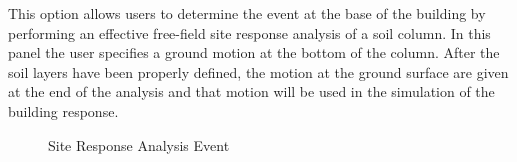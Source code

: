 This option allows users to determine the event at the base of the 
building by performing an effective free-field site response 
analysis of a soil column. In this panel the user specifies a ground 
motion at the bottom of the column. After the soil layers have been properly 
defined, the motion at the ground surface are given at the end 
of the analysis and that motion will be used in the 
simulation of the building response. 



\begin{figure}[!htbp]
  \caption{Site Response Analysis Event}
  \label{fig:s3hark1}
\end{figure}

